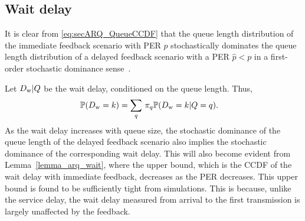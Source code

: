 \subsection{Wait delay}
It is clear from \eqref{eq:secARQ_QueueCCDF} that the queue length distribution of the immediate feedback scenario with PER $p$ stochastically dominates the queue length distribution of a delayed feedback scenario with a PER $\hat{p} < p$ in a first-order stochastic dominance sense~\cite{whang2019econometric}.


Let $D_{\mathrm{w}}\vert Q$ be the wait delay, conditioned on the queue length. Thus, 
\begin{align*}
    \mathbb{P}(D_{\mathrm{w}} =k)&=\sum_q\,\pi_q\mathbb{P}(D_{\mathrm{w}} ={k}\vert Q=q).
\end{align*}
As the wait delay increases with queue size, the stochastic dominance of the queue length of the delayed feedback scenario also implies the stochastic dominance of the corresponding wait delay. This will also become evident from Lemma~\ref{lemma_arq_wait}, where the upper bound, which is the CCDF of the wait delay with immediate feedback, decreases as the PER decreases. 
This upper bound is found to be sufficiently tight from simulations. This is because, unlike the service delay, the wait delay measured from arrival to the first transmission is largely unaffected by the feedback.


